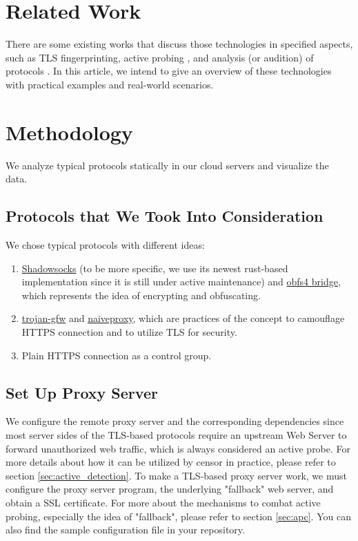 \documentclass[conference]{IEEEtran}
\begin{document}
\section{Related Work}
There are some existing works that discuss those technologies in specified aspects, such as TLS fingerprinting\cite{TLS_Fingerprinting}, active probing \cite{Active_Probing}, and analysis (or audition) of protocols \cite{shadowsocks_analysis} \cite{Trojan_Probe}. In this article, we intend to give an overview of these technologies with practical examples and real-world scenarios.

\section{Methodology}
We analyze typical protocols statically in our cloud servers and visualize the data.

\subsection{Protocols that We Took Into Consideration}
We chose typical protocols with different ideas:
\begin{enumerate}
    \item \href{https://shadowsocks.org}{Shadowsocks} (to be more specific, we use its newest rust-based implementation since it is still under active maintenance) and \href{https://gitlab.com/yawning/obfs4}{obfs4 bridge}, which represents the idea of encrypting and obfuscating.
    \item \href{https://trojan-gfw.github.io/trojan/}{trojan-gfw} and \href{https://github.com/klzgrad/naiveproxy}{naiveproxy}, which are practices of the concept to camouflage HTTPS connection and to utilize TLS for security.
    \item Plain HTTPS connection as a control group.
\end{enumerate}

\subsection{Set Up Proxy Server}
We configure the remote proxy server and the corresponding dependencies since most server sides of the TLS-based protocols require an upstream Web Server to forward unauthorized web traffic, which is always considered an active probe. For more details about how it can be utilized by censor in practice, please refer to section \ref{sec:active_detection}.
To make a TLS-based proxy server work, we must configure the proxy server program, the underlying "fallback" web server, and obtain a SSL certificate. For more about the mechanisms to combat active probing, especially the idea of "fallback", please refer to section \ref{sec:apc}. You can also find the sample configuration file in your repository. %
\end{document}
